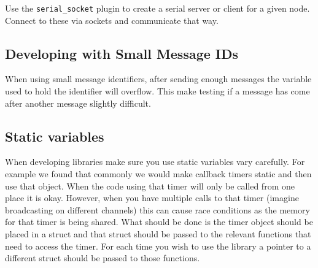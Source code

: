 Use the \verb|serial_socket| plugin to create a serial server or client for a given node. Connect to these via sockets and communicate that way.

\subsection{Developing with Small Message IDs}

When using small message identifiers, after sending enough messages the variable used to hold the identifier will overflow. This make testing if a message has come after another message slightly difficult.


\subsection{Static variables}

When developing libraries make sure you use static variables vary carefully. For example we found that commonly we would make callback timers static and then use that object. When the code using that timer will only be called from one place it is okay. However, when you have multiple calls to that timer (imagine broadcasting on different channels) this can cause race conditions as the memory for that timer is being shared. What should be done is the timer object should be placed in a struct and that struct should be passed to the relevant functions that need to access the timer. For each time you wish to use the library a pointer to a different struct should be passed to those functions.


